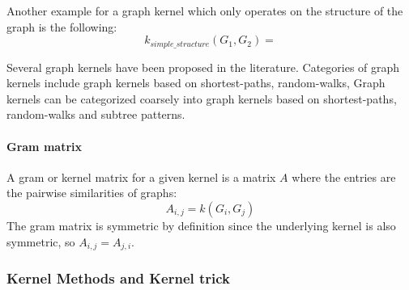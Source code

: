 Another example for a graph kernel which only operates on the structure of the graph is the following:
\begin{equation*}
k_{simple\_structure}(G_1, G_2) = 
\end{equation*}

Several graph kernels have been proposed in the literature.
Categories of graph kernels include graph kernels based on shortest-paths, random-walks, 
Graph kernels can be categorized coarsely into graph kernels based on shortest-paths, random-walks and subtree patterns.


\paragraph{Gram matrix}
A gram or kernel matrix for a given kernel is a matrix $A$ where the entries are the pairwise similarities of graphs:
\begin{equation*}
    A_{i,j} = k(G_i, G_j)
\end{equation*}
The gram matrix is symmetric by definition since the underlying kernel is also symmetric, so $A_{i,j} = A_{j, i}$.

\subsubsection{Kernel Methods and Kernel trick}




